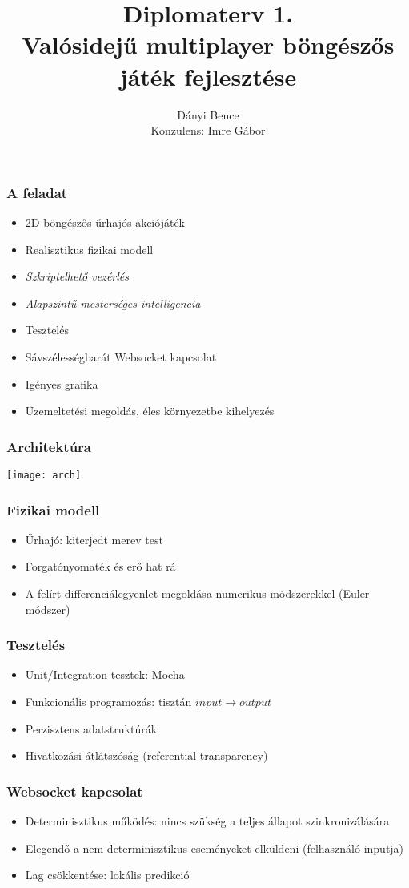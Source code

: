 \documentclass[xetex]{beamer}
\title{Diplomaterv 1.\\Valósidejű multiplayer böngészős játék fejlesztése}
\author{Dányi Bence\\\tiny{Konzulens: Imre Gábor}}
\begin{document}
  \frame{\titlepage}
  \begin{frame}
    \frametitle{A feladat}
    \begin{itemize}
      \item 2D böngészős űrhajós akciójáték
      \item Realisztikus fizikai modell
      \item \textit{Szkriptelhető vezérlés}
      \item \textit{Alapszintű mesterséges intelligencia}
      \item Tesztelés
      \item Sávszélességbarát Websocket kapcsolat
      \item Igényes grafika
      \item Üzemeltetési megoldás, éles környezetbe kihelyezés
    \end{itemize}
  \end{frame}
  \begin{frame}
    \frametitle{Architektúra}
    \texttt{[image: arch]}
  \end{frame}
  \begin{frame}
    \frametitle{Fizikai modell}
    \begin{itemize}
      \item Űrhajó: kiterjedt merev test
      \item Forgatónyomaték és erő hat rá
      \item A felírt differenciálegyenlet megoldása numerikus módszerekkel (Euler módszer)
    \end{itemize}
  \end{frame}
  \begin{frame}
    \frametitle{Tesztelés}
    \begin{itemize}
      \item Unit/Integration tesztek: Mocha
      \item Funkcionális programozás: tisztán $input \to output$
      \item Perzisztens adatstruktúrák
      \item Hivatkozási átlátszóság (referential transparency)
    \end{itemize}
  \end{frame}
  \begin{frame}
    \frametitle{Websocket kapcsolat}
    \begin{itemize}
      \item Determinisztikus működés: nincs szükség a teljes állapot szinkronizálására
      \item Elegendő a nem determinisztikus eseményeket elküldeni (felhasználó inputja)
      \item Lag csökkentése: lokális predikció
    \end{itemize}
  \end{frame}
\end{document}
